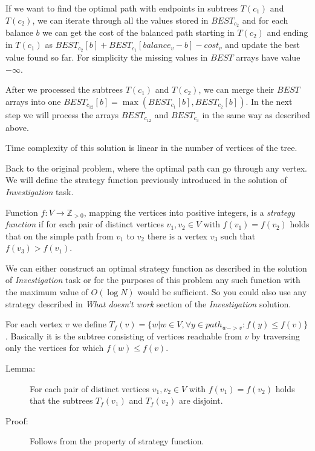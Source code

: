 If we want to find the optimal path with endpoints in subtrees $T(c_1)$ and $T(c_2)$, we can
iterate through all the values stored in $BEST_{c_2}$ and for each balance $b$
we can get the cost of the balanced path starting in $T(c_2)$ and ending in $T(c_1)$
as $BEST_{c_2}[b] + BEST_{c_1}[balance_v-b] - cost_v$ and update the best value found so far.
For simplicity the missing values in $BEST$ arrays have value $-\infty$.

After we processed the subtrees $T(c_1)$ and $T(c_2)$, we can merge their $BEST$ arrays
into one $BEST_{c_12}[b] = \max(BEST_{c_1}[b], BEST_{c_2}[b])$.
In the next step we will process the arrays $BEST_{c_12}$ and $BEST_{c_3}$ in the same way as described above.

Time complexity of this solution is linear in the number of vertices of the tree.



Back to the original problem, where the optimal path can go through any vertex.
We will define the strategy function previously introduced in the solution of \emph{Investigation} task.

Function $f : V \to \mathbb Z_{> 0}$, mapping the vertices into positive integers, is a \emph{strategy function} if
for each pair of distinct vertices $v_1, v_2 \in V$ with $f(v_1) = f(v_2)$ holds that
on the simple path from $v_1$ to $v_2$ there is a vertex $v_3$ such that $f(v_3) > f(v_1)$.

We can either construct an optimal strategy function as described in the solution of \emph{Investigation} task
or for the purposes of this problem any such function with the maximum value of $O(\log N)$ would be sufficient.
So you could also use any strategy described in \emph{What doesn't work} section of the \emph{Investigation} solution.

For each vertex $v$ we define $T_f(v) = \{w | w \in V, \forall y \in path_{w->v}: f(y) \leq f(v) \}$.
Basically it is the subtree consisting of vertices reachable from $v$ by traversing only the vertices for which $f(w) \leq f(v)$.

\begin{description}
\item[Lemma:] For each pair of distinct vertices $v_1, v_2 \in V$ with $f(v_1) = f(v_2)$ holds that
the subtrees $T_f(v_1)$ and $T_f(v_2)$ are disjoint.
\item[Proof:] Follows from the property of strategy function.
\end{description}

